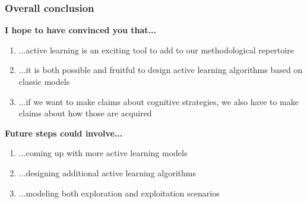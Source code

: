 \documentclass{beamer}
\begin{document}
\begin{frame}
 \frametitle{Overall conclusion}
\textbf{I hope to have convinced you that...}
\begin{enumerate}
\item ...active learning is an exciting tool to add to our methodological repertoire
\item ...it is both possible and fruitful to design active learning algorithms based on classic models
\item ...if we want to make claims about cognitive strategies, we also have to make claims about how those are acquired
\end{enumerate}
\textbf{Future steps could involve...}
\begin{enumerate}
\item ...coming up with more active learning models
\item ...designing additional active learning algorithms
\item ...modeling both exploration and exploitation scenarios
\end{enumerate}
\end{frame}
\end{document}
